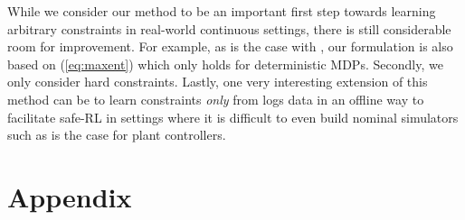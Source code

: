 \documentclass{article}
\begin{document}
While we consider our method to be an important first step towards learning arbitrary constraints in real-world continuous settings, there is still considerable room for improvement. For example, as is the case with \citeauthor{scobee2020maximum}, our formulation is also based on (\ref{eq:maxent}) which only holds for deterministic MDPs. Secondly, we only consider hard constraints. Lastly, one very interesting extension of this method can be to learn constraints \textit{only} from logs data in an offline way to facilitate safe-RL in settings where it is difficult to even build nominal simulators such as is the case for plant controllers.




\newpage
\onecolumn
\section{Appendix}

\end{document}
